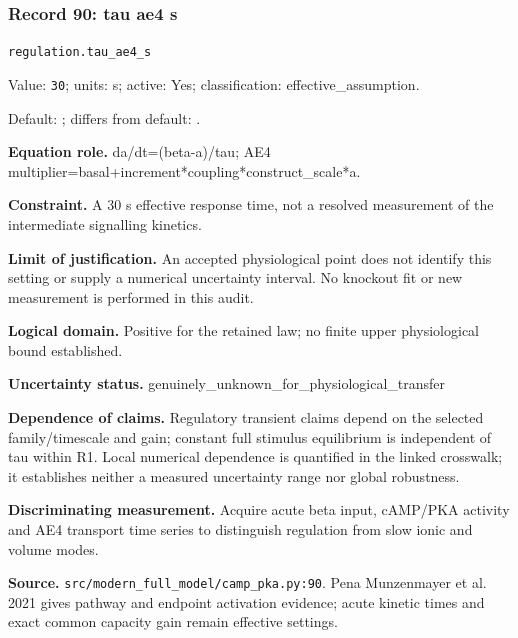 \subsubsection*{Record 90: tau ae4 s}
{\small \nolinkurl{regulation.tau_ae4_s}\par

Value: \texttt{30}; units: s; active: Yes; classification: effective\_assumption.\par

Default: ; differs from default: .\par

\textbf{Equation role.} da/dt=(beta-a)/tau; AE4 multiplier=basal+increment*coupling*construct\_scale*a.\par

\textbf{Constraint.} A 30 s effective response time, not a resolved measurement of the intermediate signalling kinetics.\par

\textbf{Limit of justification.} An accepted physiological point does not identify this setting or supply a numerical uncertainty interval. No knockout fit or new measurement is performed in this audit.\par

\textbf{Logical domain.} Positive for the retained law; no finite upper physiological bound established.\par

\textbf{Uncertainty status.} genuinely\_unknown\_for\_physiological\_transfer\par

\textbf{Dependence of claims.} Regulatory transient claims depend on the selected family/timescale and gain; constant full stimulus equilibrium is independent of tau within R1. Local numerical dependence is quantified in the linked crosswalk; it establishes neither a measured uncertainty range nor global robustness.\par

\textbf{Discriminating measurement.} Acquire acute beta input, cAMP/PKA activity and AE4 transport time series to distinguish regulation from slow ionic and volume modes.\par

\textbf{Source.} \nolinkurl{src/modern_full_model/camp_pka.py:90}. Pena Munzenmayer et al. 2021 gives pathway and endpoint activation evidence; acute kinetic times and exact common capacity gain remain effective settings.\par}


